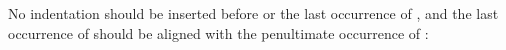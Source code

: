 \documentclass{article}
\begin{document}
No indentation should be inserted before  or
the last occurrence of , and the last
occurrence of  should be aligned with the
penultimate occurrence of :
\begin{code}%
%
\>[2]\<%
\\
\>[2][@{}l@{\AgdaIndent{0}}]%
\>[4]%
\>[7]\AgdaSymbol{:}\AgdaSpace{}%
\<%
\\
%
\>[4]%
\>[7]\AgdaSymbol{:}%
\>[1I]\AgdaSpace{}%
\<%
\\
\>[.][@{}l@{}]\<[1I]%
\>[9]\<%
\end{code}
\end{document}
